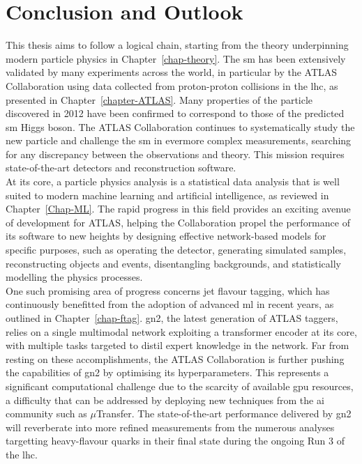 \chapter{\color{oxfordblue} Conclusion and Outlook}\label{chap-Conclusion}
\ChapFrame
\vspace{-1cm}
This thesis aims to follow a logical chain, starting from the theory underpinning modern particle physics in Chapter~\ref{chap-theory}. The \gls{sm} has been extensively validated by many experiments across the world, in particular by the ATLAS Collaboration using data collected from proton-proton collisions in the \gls{lhc}, as presented in Chapter~\ref{chapter-ATLAS}. Many properties of the particle discovered in 2012 have been confirmed to correspond to those of the predicted \gls{sm} Higgs boson. The ATLAS Collaboration continues to systematically study the new particle and challenge the \gls{sm} in evermore complex measurements, searching for any discrepancy between the observations and theory. This mission requires state-of-the-art detectors and reconstruction software. \\

At its core, a particle physics analysis is a statistical data analysis that is well suited to modern machine learning and artificial intelligence, as reviewed in Chapter~\ref{Chap-ML}. The rapid progress in this field provides an exciting avenue of development for ATLAS, helping the Collaboration propel the performance of its software to new heights by designing effective network-based models for specific purposes, such as operating the detector, generating simulated samples, reconstructing objects and events, disentangling backgrounds, and statistically modelling the physics processes. \\

One such promising area of progress concerns jet flavour tagging, which has continuously benefitted from the adoption of advanced \gls{ml} in recent years, as outlined in Chapter~\ref{chap-ftag}. \gls{gn2}, the latest generation of ATLAS taggers, relies on a single multimodal network exploiting a transformer encoder at its core, with multiple tasks targeted to distil expert knowledge in the network. Far from resting on these accomplishments, the ATLAS Collaboration is further pushing the capabilities of \gls{gn2} by optimising its hyperparameters. This represents a significant computational challenge due to the scarcity of available \gls{gpu} resources, a difficulty that can be addressed by deploying new techniques from the \gls{ai} community such as $\mu$Transfer. The state-of-the-art performance delivered by \gls{gn2} will reverberate into more refined measurements from the numerous analyses targetting heavy-flavour quarks in their final state during the ongoing Run 3 of the \gls{lhc}.  \\

